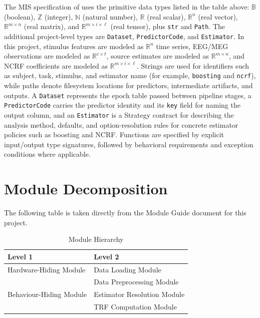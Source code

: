 \documentclass[12pt, titlepage]{article}
\begin{document}
\noindent
The MIS specification of \progname{} uses the primitive data types listed in
the table above: $\mathbb{B}$ (boolean), $\mathbb{Z}$ (integer),
$\mathbb{N}$ (natural number), $\mathbb{R}$ (real scalar),
$\mathbb{R}^{n}$ (real vector), $\mathbb{R}^{m \times n}$ (real matrix), and
$\mathbb{R}^{m \times i \times \ell}$ (real tensor), plus \texttt{str} and
\texttt{Path}. The additional project-level types are \texttt{Dataset},
\texttt{PredictorCode}, and \texttt{Estimator}. In this project, stimulus features are modeled as
$\mathbb{R}^{n}$ time series, EEG/MEG observations are modeled as
$\mathbb{R}^{c \times t}$, source estimates are modeled as
$\mathbb{R}^{m \times n}$, and NCRF coefficients are modeled as
$\mathbb{R}^{m \times i \times \ell}$. Strings are used for identifiers such
as subject, task, stimulus, and estimator name (for example,
\texttt{boosting} and \texttt{ncrf}), while paths denote filesystem locations
for predictors, intermediate artifacts, and outputs. A \texttt{Dataset}
represents the epoch table passed between pipeline stages, a
\texttt{PredictorCode} carries the predictor identity and its \texttt{key}
field for naming the output column, and an \texttt{Estimator} is a Strategy
contract for describing the analysis method, defaults, and option-resolution
rules for concrete estimator policies such as boosting and NCRF. Functions are specified by explicit input/output type signatures,
followed by behavioral requirements and exception conditions where applicable.

\section{Module Decomposition}

The following table is taken directly from the Module Guide document for this project.

\begin{table}[h!]
\centering
\begin{tabular}{p{} p{}}
\toprule
\textbf{Level 1} & \textbf{Level 2}\\
\midrule

{Hardware-Hiding Module} & Data Loading Module \\
\midrule

\multirow{3}{0.3\textwidth}{Behaviour-Hiding Module} & Data Preprocessing Module\\
& Estimator Resolution Module\\
& TRF Computation Module\\
\bottomrule

\end{tabular}
\caption{Module Hierarchy}
\label{TblMH}
\end{table}
\end{document}
